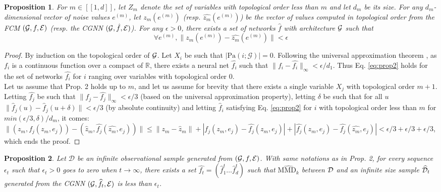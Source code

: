 \documentclass[a4paper, 11pt]{article}
\newtheorem{prop}{Proposition}
\newcommand{\Pa}[1]{\text{Pa}({#1}; \mathcal{G})}
\begin{document}
\begin{prop}
For $m \in [[1,d]]$, let $Z_m$ denote the set of variables with topological order less than $m$ and let $d_m$ be its size. For any $d_m$-dimensional vector of noise values $e^{(m)}$, let $z_m(e^{(m)})$ (resp. $\widehat{z_m}(e^{(m)})$) be the vector of values computed in topological order from the FCM $({\cal G}, f, {\cal E})$ (resp. the CGNN $({\cal G}, \hat{f}, {\cal E})$). 
For any $\epsilon > 0$, there exists a set of networks $\hat{f}$ with architecture $\cal G$ such that 
\begin{equation}
\forall e^{(m)},  \|z_m(e^{(m)})- \widehat{z_m}(e^{(m)})\| < \epsilon
\label{eq:prop2}
\end{equation}
\end{prop}


\begin{proof}
By induction on the topological order of $\cal G$. Let $X_i$ be such that $|\Pa{i}|=0$. 
Following the universal approximation theorem \cite{cybenko1989approximation}, as $f_i$ is a continuous function over a compact of $\mathbb{R}$, there exists a neural net $\hat{f_{i}}$ such that $\|f_i - \hat{f_{i}}\|_\infty < \epsilon/d_1$. Thus  Eq. \ref{eq:prop2} holds for the set of networks $\hat{f_i}$ for $i$ ranging over variables with topological order 0.\\
Let us assume that Prop. 2 holds up to $m$, and let us assume for brevity that there exists a single variable $X_j$ with topological order $m +1$. Letting $\hat{f_j}$ be such that $\|f_j - \hat{f_j}\|_\infty < \epsilon/3$ (based on the universal approximation property), letting $\delta$ be such that for all $u$ $\|\hat f_j(u) - \hat f_j(u+\delta)\|< \epsilon/3$ (by absolute continuity) and letting $\hat f_i$ satisfying Eq. \ref{eq:prop2} for $i$ with topological order less than $m$ for $min(\epsilon/3,\delta)/d_{m}$, it comes: 
$\|(z_m,f_j(z_m,e_j)) - (\hat z_m,\hat{f_j}(\hat{z_m}, e_j))\| \le \|z_m - \hat z_m\| + |f_j(z_m,e_j) - \hat{f_j}(z_m, e_j)| +  | \hat{f_j}(z_m,e_j) - \hat{f_j}(\hat{z_m}, e_j)| < \epsilon/3 + \epsilon/3 + \epsilon/3$, which ends the proof.
\end{proof}

\begin{prop}
Let  $\mathcal{D}$ be an infinite observational sample generated from $({\cal G}, f, {\cal E})$.
With same notations as in Prop. 2, for every  sequence $\epsilon_t$ such that $\epsilon_t >0$ goes to zero when $t \rightarrow \infty$, there exists a set $\widehat{f_t} = (\hat f^{t}_1 \ldots \hat f^{t}_d)$ such that $\widehat{\text{MMD}_k}$ between $\cal D$ and an infinite size sample $\widehat{\cal D}_{t}$ generated from the CGNN $({\cal G},\widehat{f_{t}},\cal E)$ is less than $\epsilon_t$.
 \end{prop}
 
\end{document}
